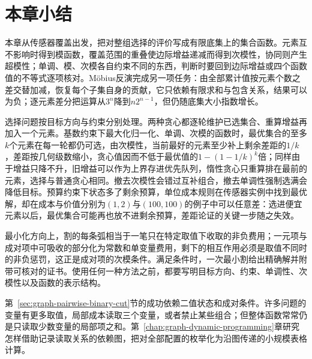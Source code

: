
\section{本章小结}
\label{sec:graph-set-functions-summary}

本章从传感器覆盖出发，把对整组选择的评价写成有限底集上的集合函数。元素互不影响时得到模函数，覆盖范围的重叠使边际增益递减而得到次模性，协同则产生超模性；单调、模、次模各自约束不同的东西，判断时要回到边际增益或四个函数值的不等式逐项核对。Möbius反演完成另一项任务：由全部累计值按元素个数之差交替加减，恢复每个子集自身的贡献，它只依赖有限求和与包含关系，结果可以为负；逐元素差分把运算从$3^n$降到$n2^{n-1}$，但仍随底集大小指数增长。

选择问题按目标方向与约束分别处理。两种贪心都逐轮维护已选集合、重算增益再加入一个元素。基数约束下最大化归一化、单调、次模的函数时，最优集合的至多$k$个元素在每一轮都仍可选，由次模性，当前最好的元素至少补上剩余差距的$1/k$，差距按几何级数缩小，贪心值因而不低于最优值的$1-(1-1/k)^k$倍；同样由于增益只降不升，旧增益可以作为上界存进优先队列，惰性贪心只重算排在最前的元素，选择与普通贪心相同。撤去次模性会错过互补组合，撤去单调性强制选满会降低目标。预算约束下状态多了剩余预算，单位成本规则在传感器实例中找到最优解，却在成本与价值分别为$(1,2)$与$(100,100)$的例子中可以任意差：选进便宜元素以后，最优集合可能再也放不进剩余预算，差距论证的关键一步随之失效。

最小化方向上，割的每条弧相当于一笔只在特定取值下收取的非负费用；一元项与成对项中可吸收的部分化为常数和单变量费用，剩下的相互作用必须是取值不同时的非负惩罚，这正是成对项的次模条件。满足条件时，一次最小割给出精确解并附带可核对的证书。使用任何一种方法之前，都要写明目标方向、约束、单调性、次模性以及函数的表示结构。

第~\ref{sec:graph-pairwise-binary-cut}节的成功依赖二值状态和成对条件。许多问题的变量有更多取值，局部成本读取三个变量，或者禁止某些组合；但整体函数常常仍是只读取少数变量的局部项之和。第~\ref{chap:graph-dynamic-programming}章研究怎样借助记录读取关系的依赖图，把对全部配置的枚举化为沿图传递的小规模表格计算。
